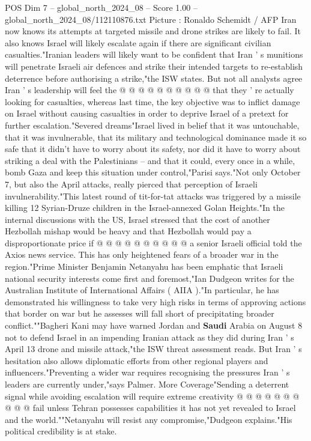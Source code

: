 \begin{textsample}{POS Dim 7 – global\_north\_2024\_08 – Score 1.00 – global\_north\_2024\_08/112110876.txt}
Picture : Ronaldo Schemidt / AFP Iran now knows its attempts at targeted missile and drone strikes are likely to fail.
It also knows Israel will likely escalate again if there are significant civilian casualties."Iranian leaders will likely want to be confident that Iran ' s munitions will penetrate Israeli air defences and strike their intended targets to re-establish deterrence before authorising a strike,"the ISW states.
But not all analysts agree Iran ' s leadership will feel the @ @ @ @ @ @ @ @ @ @ that they ' re actually looking for casualties, whereas last time, the key objective was to inflict damage on Israel without causing casualties in order to deprive Israel of a pretext for further escalation."Severed dreams"Israel lived in belief that it was untouchable, that it was invulnerable, that its military and technological dominance made it so safe that it didn't have to worry about its safety, nor did it have to worry about striking a deal with the Palestinians -- and that it could, every once in a while, bomb Gaza and keep this situation under control,"Parisi says."Not only October 7, but also the April attacks, really pierced that perception of Israeli invulnerability."This latest round of tit-for-tat attacks was triggered by a missile killing 12 Syrian-Druze children in the Israel-annexed Golan Heights."In the internal discussions with the US, Israel stressed that the cost of another Hezbollah mishap would be heavy and that Hezbollah would pay a disproportionate price if @ @ @ @ @ @ @ @ @ @ a senior Israeli official told the Axios news service.
This has only heightened fears of a broader war in the region."Prime Minister Benjamin Netanyahu has been emphatic that Israeli national security interests come first and foremost,"Ian Dudgeon writes for the Australian Institute of International Affairs ( AIIA )."In particular, he has demonstrated his willingness to take very high risks in terms of approving actions that border on war but he assesses will fall short of precipitating broader conflict.""Bagheri Kani may have warned Jordan and \textbf{Saudi} Arabia on August 8 not to defend Israel in an impending Iranian attack as they did during Iran ' s April 13 drone and missile attack,"the ISW threat assessment reads.
But Iran ' s hesitation also allows diplomatic efforts from other regional players and influencers."Preventing a wider war requires recognising the pressures Iran ' s leaders are currently under,"says Palmer.
More Coverage"Sending a deterrent signal while avoiding escalation will require extreme creativity @ @ @ @ @ @ @ @ @ @ fail unless Tehran possesses capabilities it has not yet revealed to Israel and the world.""Netanyahu will resist any compromise,"Dudgeon explains."His political credibility is at stake.

\end{textsample}
